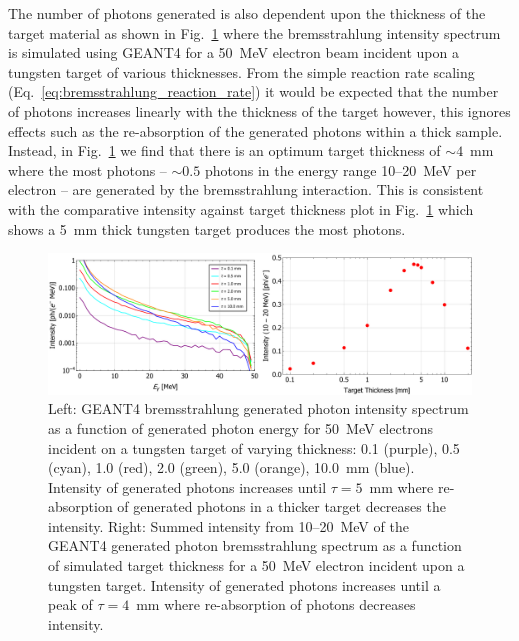 \documentclass[../main.tex]{subfiles}
\begin{document}
The number of photons generated is also dependent upon the thickness of the target material as shown in Fig.~\ref{fig:bremsstrahlung_target_thickness} where the bremsstrahlung intensity spectrum is simulated using \textsc{GEANT4} \cite{agostinelli2003geant4} for a 50~\si{\mega\electronvolt} electron beam incident upon a tungsten target of various thicknesses. From the simple reaction rate scaling (Eq.~\ref{eq:bremsstrahlung_reaction_rate}) it would be expected that the number of photons increases linearly with the thickness of the target however, this ignores effects such as the re-absorption of the generated photons within a thick sample. Instead, in Fig.~\ref{fig:bremsstrahlung_target_thickness} we find that there is an optimum target thickness of $\sim 4$~\si{\milli\meter} where the most photons -- $\sim 0.5$ photons in the energy range 10--20~\si{\mega\electronvolt} per electron -- are generated by the bremsstrahlung interaction. This is consistent with the comparative intensity against target thickness plot in Fig.~\ref{fig:bremsstrahlung_target_thickness} which shows a 5~\si{\milli\meter} thick tungsten target produces the most photons.  
\begin{figure}[!h]
\centering
\includegraphics[width=\textwidth]{Figures/DIANA_Inverse_Compton_Source_Design/brem_thickness_studies.pdf}
\caption{Left: \textsc{GEANT4} bremsstrahlung generated photon intensity spectrum as a function of generated photon energy for 50~\si{\mega\electronvolt} electrons incident on a tungsten target of varying thickness: 0.1 (purple), 0.5 (cyan), 1.0 (red), 2.0 (green), 5.0 (orange), 10.0~\si{\milli\meter} (blue). Intensity of generated photons increases until $\tau = 5$~\si{\milli\meter} where re-absorption of generated photons in a thicker target decreases the intensity. Right: Summed intensity from 10--20~\si{\mega\electronvolt} of the \textsc{GEANT4} generated photon bremsstrahlung spectrum as a function of simulated target thickness for a 50~\si{\mega\electronvolt} electron incident upon a tungsten target. Intensity of generated photons increases until a peak of $\tau = 4$~\si{\milli\meter} where re-absorption of photons decreases intensity.}
\label{fig:bremsstrahlung_target_thickness}
\end{figure}
\end{document}
